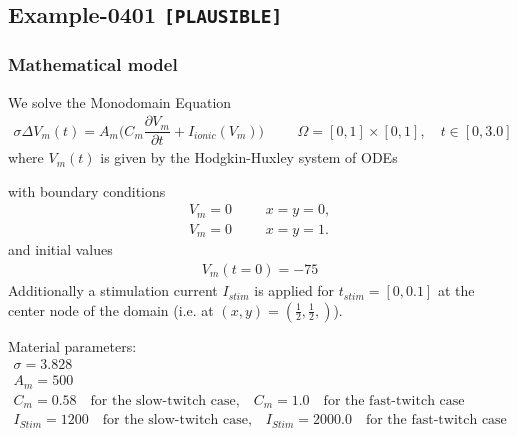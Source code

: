 %
\clearpage
%
\subsection{Example-0401 \texttt{[PLAUSIBLE]}}
%
%
\subsubsection{Mathematical model}
%
We solve the Monodomain Equation
%
\begin{align}
    \sigma \Delta V_m(t) = A_m\Big(C_m \dfrac{\partial V_m}{\partial t} + I_{ionic}(V_m)\Big) & &&\Omega = [0, 1] \times [0, 1], \quad t \in [0, 3.0]
\end{align}
%
where $V_m(t)$ is given by the Hodgkin-Huxley system of ODEs \cite{hodgkin1952propagation}

with boundary conditions
%
\begin{align}
    V_m = 0 & &&x = y = 0, \\
    V_m = 0 & &&x = y = 1.
\end{align}
and initial values
%
\begin{equation*}
  \begin{array}{lll}
    V_m(t=0) = -75
  \end{array}
\end{equation*}
%
Additionally a stimulation current $I_{stim}$ is applied for $t_{stim} = [0, 0.1]$ at the center node of the domain (i.e. at $(x,y) = (\frac12, \frac12,)$).
%

Material parameters:
\begin{equation*}
  \begin{array}{lll}
    \sigma = 3.828\\[4mm]
    A_m = 500\\[4mm]
    C_m = 0.58 \quad \text{for the slow-twitch case,} \quad C_m = 1.0 \quad \text{for the fast-twitch case}\\[4mm]
    I_{Stim} = 1200 \quad \text{for the slow-twitch case,} \quad I_{Stim} = 2000.0 \quad \text{for the fast-twitch case}\\[4mm]
  \end{array}
\end{equation*}
%
%
